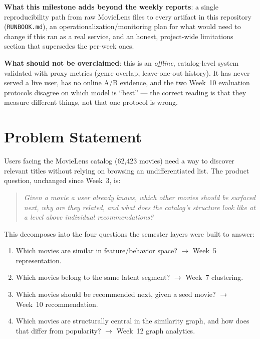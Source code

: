 \documentclass[12pt,a4paper]{article}
\begin{document}
\textbf{What this milestone adds beyond the weekly reports}: a single reproducibility path from raw
MovieLens files to every artifact in this repository (\texttt{RUNBOOK.md}), an
operationalization/monitoring plan for what would need to change if this ran as a real service, and
an honest, project-wide limitations section that supersedes the per-week ones.

\textbf{What should not be overclaimed}: this is an \emph{offline}, catalog-level system validated
with proxy metrics (genre overlap, leave-one-out history). It has never served a live user, has no
online A/B evidence, and the two Week~10 evaluation protocols disagree on which model is ``best''
--- the correct reading is that they measure different things, not that one protocol is wrong.

\section{Problem Statement}

Users facing the MovieLens catalog (62,423 movies) need a way to discover relevant titles without
relying on browsing an undifferentiated list. The product question, unchanged since Week~3, is:

\begin{quote}
  \textit{Given a movie a user already knows, which other movies should be surfaced next, why are
  they related, and what does the catalog's structure look like at a level above individual
  recommendations?}
\end{quote}

This decomposes into the four questions the semester layers were built to answer:
\begin{enumerate}[nosep]
  \item Which movies are similar in feature/behavior space? $\to$ Week~5 representation.
  \item Which movies belong to the same latent segment? $\to$ Week~7 clustering.
  \item Which movies should be recommended next, given a seed movie? $\to$ Week~10 recommendation.
  \item Which movies are structurally central in the similarity graph, and how does that differ
    from popularity? $\to$ Week~12 graph analytics.
\end{enumerate}
\end{document}
